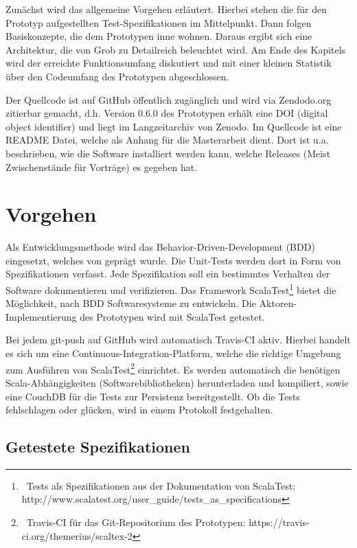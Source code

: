  
Zunächst wird das allgemeine Vorgehen erläutert. Hierbei stehen die für den Prototyp aufgestellten Test-Spezifikationen im Mittelpunkt. Dann folgen Basiskonzepte, die dem Prototypen inne wohnen. Daraus ergibt sich eine Architektur, die von Grob zu Detailreich beleuchtet wird. Am Ende des Kapitels wird der erreichte Funktionsumfang diskutiert und mit einer kleinen Statistik über den Codeumfang des Prototypen abgeschlossen.

 
Der Quellcode \citep{HodappScaltex} ist auf GitHub öffentlich zugänglich und wird via Zendodo.org zitierbar gemacht, d.h. Version 0.6.0 des Prototypen erhält eine DOI (digital object identifier) und liegt im Langzeitarchiv von Zenodo. Im Quellcode ist eine README Datei, welche als Anhang für die Masterarbeit dient. Dort ist u.a. beschrieben, wie die Software installiert werden kann, welche Releases (Meist Zwischenstände für Vorträge) es gegeben hat.

 
\section{Vorgehen}\label{}
 
Als Entwicklungsmethode wird das Behavior-Driven-Development (BDD) eingesetzt, welches von \citep{North} geprägt wurde. Die Unit-Tests werden dort in Form von Spezifikationen verfasst. Jede Spezifikation soll ein bestimmtes Verhalten der Software dokumentieren und verifizieren. Das Framework ScalaTest\footnote{~Tests als Spezifikationen aus der Dokumentation von ScalaTest: http://www.scalatest.org/user\_guide/tests\_as\_specifications} bietet die Möglichkeit, nach BDD Softwaresysteme zu entwickeln. Die Aktoren-Implementierung des Prototypen wird mit ScalaTest getestet.

 
Bei jedem git-push auf GitHub wird automatisch Travis-CI aktiv. Hierbei handelt es sich um eine Continuous-Integration-Platform, welche die richtige Umgebung zum Ausführen von ScalaTest\footnote{~Travis-CI für das Git-Repositorium des Prototypen: https://travis-ci.org/themerius/scaltex-2} einrichtet. Es werden automatisch die benötigen Scala-Abhängigkeiten (Softwarebibliotheken) herunterladen und kompiliert, sowie eine CouchDB für die Tests zur Persistenz bereitgestellt. Ob die Tests fehlschlagen oder glücken, wird in einem Protokoll festgehalten.

 
\subsection{Getestete Spezifikationen}\label{}
 
